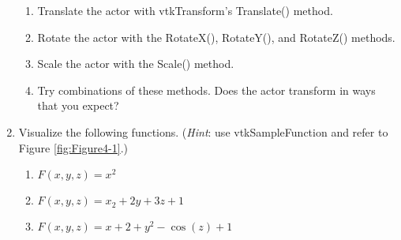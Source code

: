 \begin{enumerate}
\begin{enumerate}
    \item Translate the actor with vtkTransform's Translate() method.

    \item Rotate the actor with the RotateX(), RotateY(), and RotateZ() methods.

    \item Scale the actor with the Scale() method.

    \item Try combinations of these methods. Does the actor transform in ways that you expect?

\end{enumerate}

\item Visualize the following functions. (\emph{Hint}: use vtkSampleFunction and refer to Figure \ref{fig:Figure4-1}.)

\begin{enumerate}

    \item $F(x,y,z)=x^2$

    \item $F(x,y,z) = x_2 + 2 y + 3 z +1$

    \item $F(x,y,z) = x+2 + y^2 - \cos (z) + 1$

\end{enumerate}

\end{enumerate}

